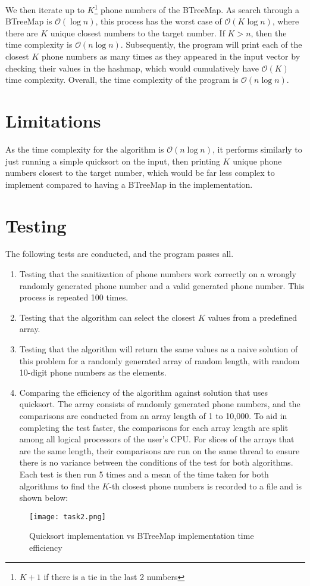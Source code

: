 \documentclass{report}
\begin{document}
We then iterate up to \(K\)\footnote{\(K+1\) if there is a tie in the last 2 numbers} phone numbers of the BTreeMap. As search through a BTreeMap is \(\mathcal{O}(\log{n})\), this process has the worst case of \(\mathcal{O}(K \log n)\), where there are \(K\) unique closest numbers to the target number. If \(K > n\), then the time complexity is \(\mathcal{O}(n \log n)\). Subsequently, the program will print each of the closest \(K\) phone numbers as many times as they appeared in the input vector by checking their values in the hashmap, which would cumulatively have \(\mathcal{O}(K)\) time complexity. Overall, the time complexity of the program is \(\mathcal{O}(n \log n)\).

\section{Limitations}
As the time complexity for the algorithm is \(\mathcal{O}(n \log n)\), it performs similarly to just running a simple quicksort on the input, then printing \(K\) unique phone numbers closest to the target number, which would be far less complex to implement compared to having a BTreeMap in the implementation.

\section{Testing}
The following tests are conducted, and the program passes all.
\begin{enumerate}
	\item Testing that the sanitization of phone numbers work correctly on a wrongly randomly generated phone number and a valid generated phone number. This process is repeated 100 times.
	\item Testing that the algorithm can select the closest \(K\) values from a predefined array.
	\item Testing that the algorithm will return the same values as a naive solution of this problem for a randomly generated array of random length, with random 10-digit phone numbers as the elements.
	\item Comparing the efficiency of the algorithm against solution that uses quicksort. The array consists of randomly generated phone numbers, and the comparisons are conducted from an array length of 1 to 10,000. To aid in completing the test faster, the comparisons for each array length are split among all logical processors of the user's CPU\@. For slices of the arrays that are the same length, their comparisons are run on the same thread to ensure there is no variance between the conditions of the test for both algorithms. Each test is then run 5 times and a mean of the time taken for both algorithms to find the \(K\)-th closest phone numbers is recorded to a file and is shown below:
\end{enumerate}
\begin{figure}[H]
	\centering
	\texttt{[image: task2.png]}
	\caption{Quicksort implementation vs BTreeMap implementation time efficiency}
	\label{fig:task2_time_eff}
\end{figure}

\renewcommand{\chaptername}{Chapter}
\setcounter{biburlnumpenalty}{9000}
\printbibliography[heading=bibnumbered]
\end{document}
